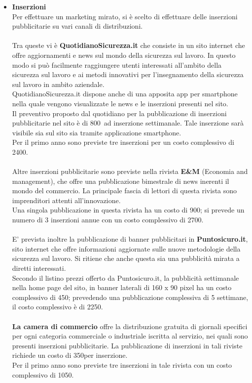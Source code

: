 \begin{itemize}
\item \textbf{Inserzioni}\\
Per effettuare un marketing mirato, si è scelto di effettuare delle inserzioni pubblicitarie su vari canali di distribuzioni.
\\
\\
Tra queste vi è \textbf{QuotidianoSicurezza.it} che consiste in un sito internet che offre aggiornamenti e news sul mondo della sicurezza sul lavoro. In questo modo si può facilmente raggiungere utenti interessati all'ambito della sicurezza sul lavoro e ai metodi innovativi per l'insegnamento della sicurezza sul lavoro in ambito aziendale.\\
QuotidianoSicurezza.it dispone anche di una apposita app per smartphone nella quale vengono visualizzate le news e le inserzioni presenti nel sito.\\
Il preventivo proposto dal quotidiano per la pubblicazione di inserzioni pubblicitarie nel sito è di 800\EUR\ ad inserzione settimanale. Tale inserzione sarà visibile sia sul sito sia tramite applicazione smartphone.\\ Per il primo anno sono previste tre inserzioni per un costo complessivo di 2400\EUR.
\\
\\
Altre inserzioni pubblicitarie sono previste nella rivista \textbf{E\&M} (Economia and management), che offre una pubblicazione bimestrale di news inerenti il mondo del commercio. La principale fascia di lettori di questa rivista sono imprenditori attenti all'innovazione.\\
Una singola pubblicazione in questa rivista ha un costo di 900\EUR; si prevede un numero di 3 inserzioni annue con un costo complessivo di 2700\EUR.
\\
\\
E' prevista inoltre la pubblicazione di banner pubblicitari in \textbf{Puntosicuro.it}, sito internet che offre informazioni aggiornate sulle nuove metodologie della sicurezza sul lavoro. Si ritiene che anche questa sia una pubblicità mirata a diretti interessati.\\
Secondo il listino prezzi offerto da Puntosicuro.it, la pubblicità settimanale nella home page del sito, in banner laterali di 160 x 90 pixel ha un costo complessivo di 450\EUR; prevedendo una pubblicazione complessiva di 5 settimane, il costo complessivo è di 2250\EUR.
\\
\\
\textbf{La camera di commercio} offre la distribuzione gratuita di giornali specifici per ogni categoria commerciale o industriale iscritta al servizio, nei quali sono presenti inserzioni pubblicitarie. La pubblicazione di inserzioni in tali riviste richiede un costo di 350\EUR per inserzione.\\
Per il primo anno sono previste tre inserzioni in tale rivista con un costo complessivo di 1050\EUR.


\end{itemize}
